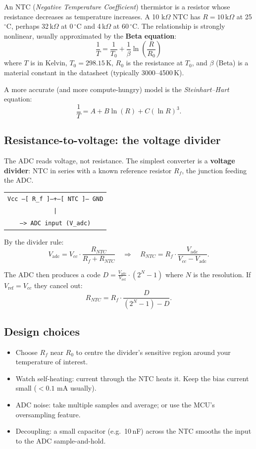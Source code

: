 \documentclass[11pt,a4paper]{article}
\begin{document}
An NTC (\emph{Negative Temperature Coefficient}) thermistor is a resistor
whose resistance decreases as temperature increases. A 10 k$\Omega$ NTC has
$R = 10\,\mathrm{k}\Omega$ at 25\,$^\circ$C, perhaps 32\,k$\Omega$ at
0\,$^\circ$C and 4\,k$\Omega$ at 60\,$^\circ$C. The relationship is
strongly nonlinear, usually approximated by the \textbf{Beta equation}:
\[
\frac{1}{T} = \frac{1}{T_0} + \frac{1}{\beta}\ln\!\left(\frac{R}{R_0}\right)
\]
where $T$ is in Kelvin, $T_0 = 298.15$\,K, $R_0$ is the resistance at
$T_0$, and $\beta$ (Beta) is a material constant in the datasheet
(typically 3000--4500\,K).

A more accurate (and more compute-hungry) model is the \emph{Steinhart--Hart}
equation:
\[
\frac{1}{T} = A + B\ln(R) + C(\ln R)^3.
\]

\subsection{Resistance-to-voltage: the voltage divider}

The ADC reads voltage, not resistance. The simplest converter is a
\textbf{voltage divider}: NTC in series with a known reference resistor
$R_f$, the junction feeding the ADC.

\begin{center}
\begin{tabular}{c}
\texttt{Vcc ---[ R\_f ]---+---[ NTC ]--- GND} \\
\texttt{\hspace{36mm}|} \\
\texttt{\hspace{36mm}---> ADC input (V\_adc)}
\end{tabular}
\end{center}

By the divider rule:
\[
V_{\text{adc}} = V_{cc} \cdot \frac{R_{NTC}}{R_f + R_{NTC}}
\quad \Rightarrow \quad
R_{NTC} = R_f \cdot \frac{V_{\text{adc}}}{V_{cc} - V_{\text{adc}}}.
\]

The ADC then produces a code $D = \frac{V_{\text{adc}}}{V_{\text{ref}}}
\cdot (2^N - 1)$ where $N$ is the resolution. If $V_{\text{ref}} = V_{cc}$
they cancel out:
\[
R_{NTC} = R_f \cdot \frac{D}{(2^N - 1) - D}.
\]

\subsection{Design choices}

\begin{itemize}[leftmargin=*]
    \item Choose $R_f$ near $R_0$ to centre the divider's sensitive region
    around your temperature of interest.
    \item Watch self-heating: current through the NTC heats it. Keep the
    bias current small ($<0.1$ mA usually).
    \item ADC noise: take multiple samples and average; or use the MCU's
    oversampling feature.
    \item Decoupling: a small capacitor (e.g.\ 10\,nF) across the NTC
    smooths the input to the ADC sample-and-hold.
\end{itemize}
\end{document}
